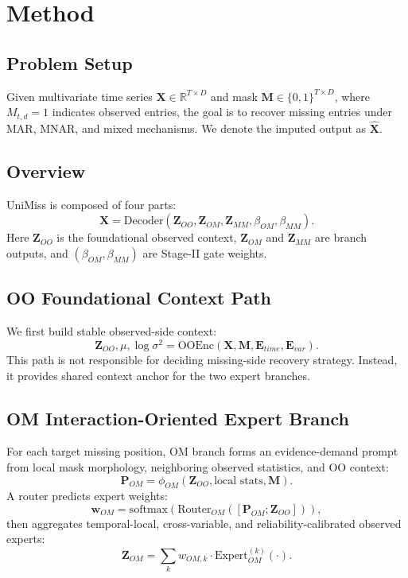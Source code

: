 \section{Method}

\subsection{Problem Setup}
Given multivariate time series $\mathbf{X}\in\mathbb{R}^{T\times D}$ and mask $\mathbf{M}\in\{0,1\}^{T\times D}$, where $M_{t,d}=1$ indicates observed entries, the goal is to recover missing entries under MAR, MNAR, and mixed mechanisms. We denote the imputed output as $\hat{\mathbf{X}}$.

\subsection{Overview}
UniMiss is composed of four parts:
\begin{equation}
\hat{\mathbf{X}}=\mathrm{Decoder}\left(\mathbf{Z}_{OO},\mathbf{Z}_{OM},\mathbf{Z}_{MM},\beta_{OM},\beta_{MM}\right).
\end{equation}
Here $\mathbf{Z}_{OO}$ is the foundational observed context, $\mathbf{Z}_{OM}$ and $\mathbf{Z}_{MM}$ are branch outputs, and $(\beta_{OM},\beta_{MM})$ are Stage-II gate weights.

\subsection{OO Foundational Context Path}
We first build stable observed-side context:
\begin{equation}
\mathbf{Z}_{OO},\mu,\log\sigma^2=\mathrm{OOEnc}(\mathbf{X},\mathbf{M},\mathbf{E}_{time},\mathbf{E}_{var}).
\end{equation}
This path is not responsible for deciding missing-side recovery strategy. Instead, it provides shared context anchor for the two expert branches.

\subsection{OM Interaction-Oriented Expert Branch}
For each target missing position, OM branch forms an evidence-demand prompt from local mask morphology, neighboring observed statistics, and OO context:
\begin{equation}
\mathbf{P}_{OM}=\phi_{OM}(\mathbf{Z}_{OO},\text{local stats},\mathbf{M}).
\end{equation}
A router predicts expert weights:
\begin{equation}
\mathbf{w}_{OM}=\mathrm{softmax}\left(\mathrm{Router}_{OM}([\mathbf{P}_{OM};\mathbf{Z}_{OO}])\right),
\end{equation}
then aggregates temporal-local, cross-variable, and reliability-calibrated observed experts:
\begin{equation}
\mathbf{Z}_{OM}=\sum_{k}w_{OM,k}\cdot \mathrm{Expert}^{(k)}_{OM}(\cdot).
\end{equation}

